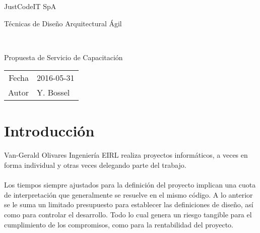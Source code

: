 \documentclass[11pt]{article}
\newcommand{\Cliente}{Van-Gerald Olivares Ingenier\'ia EIRL}
\begin{document}


\noindent{}JustCodeIT SpA\hfill{}
\vspace{1cm}
\begin{center}
\begin{huge}
   T\'ecnicas de Dise\~no Arquitectural \'Agil
\end{huge}\\[2ex]
\begin{Large}
   Propuesta de Servicio de Capacitaci\'on 
\end{Large}
\end{center}
\vspace{1cm}

\hfill{}%
\begin{scriptsize}
\begin{tabular}{rl}
    Fecha & 2016-05-31\\
    Autor & Y. Bossel\\
\end{tabular}
\end{scriptsize}

\section{Introducci\'on}
\paragraph{}
\Cliente{} realiza proyectos inform\'aticos, a veces en forma individual y otras veces
delegando parte del trabajo.

\paragraph{}
Los tiempos siempre ajustados para la definici\'on del proyecto implican 
una cuota de interpretaci\'on que generalmente se resuelve en el mismo c\'odigo.
A lo anterior se le suma un limitado presupuesto para establecer las definiciones
de dise\~no, as\'i como para controlar el desarrollo.
%
Todo lo cual genera un riesgo tangible para el cumplimiento de los compromisos,
como para la rentabilidad del proyecto.
\end{document}
